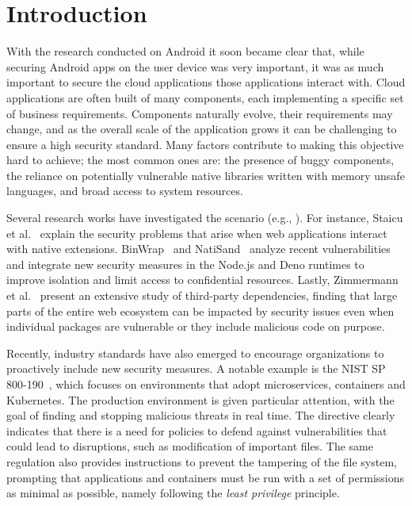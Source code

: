 \section{Introduction}
\label{dmng:sect:introduction}

With the research conducted on Android it soon became clear that,
while securing Android apps on the user device was very important,
it was as much important to secure the cloud applications those
applications interact with.
Cloud applications are often built of many components, each
implementing a specific set of business requirements. Components
naturally evolve, their requirements may change, and as the overall scale
of the application grows it can be challenging to ensure a high
security standard. Many factors contribute to making this objective
hard to achieve; the most common ones are: the presence of buggy
components, the reliance on potentially vulnerable native libraries
written with memory unsafe languages, and broad access to system
resources.

Several research works have investigated the scenario (e.g.,
\cite{staicu2021bilingual, binwrap,natisand, zimmermann-risks}). For
instance, Staicu et al.~\cite{staicu2021bilingual} explain the
security problems that arise when web applications interact with
native extensions. BinWrap~\cite{binwrap} and NatiSand~\cite{natisand}
analyze recent vulnerabilities and integrate new security
measures in the Node.js and Deno runtimes to improve isolation and
limit access to confidential resources. Lastly, 
Zimmermann et al.~\cite{zimmermann-risks} present an extensive study of third-party
dependencies, finding that large parts of the entire web ecosystem can
be impacted by security issues even when individual packages are
vulnerable or they include malicious code on purpose.

Recently, industry standards have also emerged to encourage
organizations to proactively include new security measures. A notable
example is the NIST SP 800-190~\cite{nist-sp800-190}, which focuses on
environments that adopt microservices, containers and Kubernetes. The
production environment is given particular attention, with the goal of
finding and stopping malicious threats in real time.  The directive
clearly indicates that there is a need for policies to defend against
vulnerabilities that could lead to disruptions, such as modification
of important files. The same regulation also provides instructions to
prevent the tampering of the file system, prompting that applications
and containers must be run with a set of permissions as minimal as
possible, namely following the {\em least privilege} principle.

